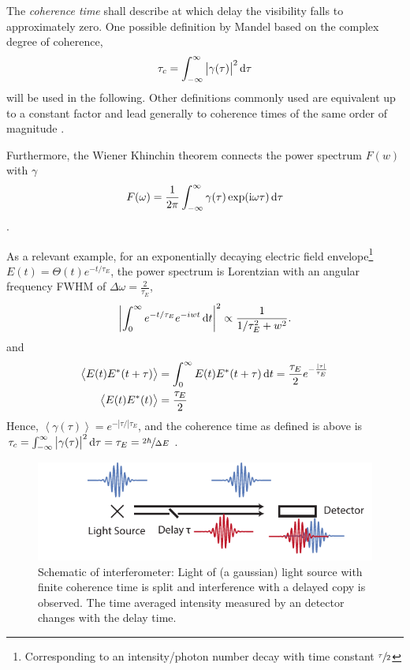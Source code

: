 The \textit{coherence time }shall describe at which delay the visibility falls to approximately zero. One possible definition by Mandel based on the complex degree of coherence,
\begin{equation}
\tau_c = \int_{-\infty}^{\infty} \left| \gamma(\tau)\right|^2 \operatorname{\mathrm{d}\!} \tau 
\end{equation} will be used in the following. Other definitions commonly used are equivalent up to a constant factor and lead generally to coherence times of the same order of magnitude \cite{mandel1959,goodman2000}. 

Furthermore, the Wiener Khinchin theorem connects the power spectrum $F(w)$ with $\gamma$
\begin{equation}
	F(\omega)=\frac{1}{2 \pi} \int_{-\infty}^{\infty} \gamma(\tau) \exp (\mathrm{i} \omega \tau)  \dif \tau
\end{equation}.

As a relevant example, for an exponentially decaying electric field envelope\footnote{Corresponding to an intensity/photon number decay with time constant $\sfrac{\tau}{2}$} $E(t)=\Theta(t)e^{-t/\tau_E}$, the power spectrum is Lorentzian with an angular frequency FWHM of $\Delta \omega=\frac{2}{\tau_E}$,
\begin{equation*}
\left|\int_{0}^{\infty}  e^{-t/\tau_E} e^{-iwt} \dif t \right|^2 \propto  \frac{1}{1/\tau_E^2+w^2} .
\end{equation*}
and
\begin{align*}
\left\langle E(t) E^{*}(t+\tau)\right\rangle
&=\int_{0}^{\infty} E(t) E^{*}(t+\tau)\operatorname{\mathrm{d}\!} t
=\frac{\tau_E}{2}   e^{-\frac{\left| \tau \right| }{\tau_E }}\\
\left\langle E(t) E^{*}(t)\right\rangle
&=\frac{\tau_E}{2} 
\end{align*}
Hence, $\left<\gamma(\tau)\right>=e^{-|\tau/| \tau_E}$,   and the coherence time as defined is above is $\tau_c=\int_{-\infty}^{\infty} \left| \gamma(\tau)\right|^2 \operatorname{\mathrm{d}\!} \tau=\tau_E=\sfrac{2\hbar}{\Delta E}$ \cite{goodman2000,pollnau2020}.



 \begin{figure}
	\centering
	\includegraphics[width=0.8\linewidth]{images/michelson.pdf}
	\caption[Schematic of interferometer]{Schematic of interferometer: Light of (a gaussian) light source with finite coherence time is split and interference with a delayed copy is observed. The time averaged intensity measured by an detector changes with the delay time. }
	\label{fig:michelson}
\end{figure}


